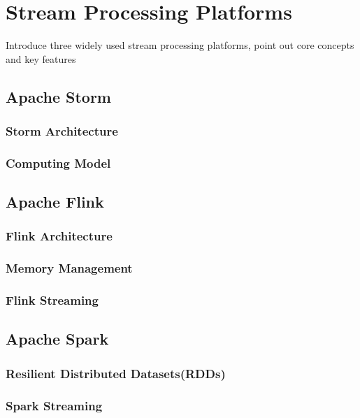 \chapter{Stream Processing Platforms}
Introduce three widely used stream processing platforms, point out core concepts and key features 

\section{Apache Storm}
\subsection{Storm Architecture}
\subsection{Computing Model}

\section{Apache Flink}
\subsection{Flink Architecture}
\subsection{Memory Management}
\subsection{Flink Streaming}


\section{Apache Spark}
\subsection{ Resilient Distributed Datasets(RDDs)}
\subsection{Spark Streaming}


\clearpage